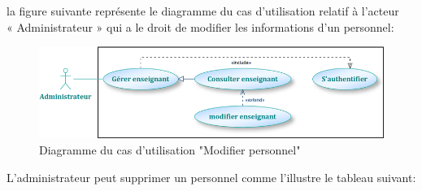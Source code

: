 \documentclass[12 pt]{report}
\begin{document}
la figure suivante représente le diagramme du cas d’utilisation  relatif à l’acteur \\« Administrateur » qui a le droit de modifier les informations d'un personnel:
\begin{figure}[h]
 \begin{center}
\includegraphics[width=12 cm ,height= 3.5 cm]{a6.PNG}
\caption{Diagramme du cas d’utilisation "Modifier personnel"}
\end{center}
\end{figure}
\newpage
L’administrateur peut supprimer un personnel comme l’illustre le tableau suivant:
\end{document}
